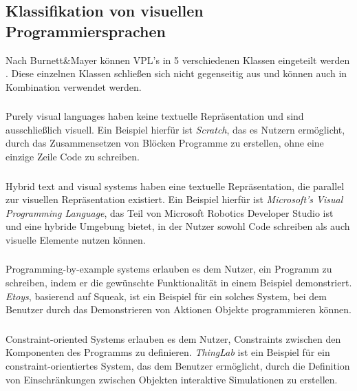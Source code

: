 \documentclass[ngerman]{article}
\begin{document}
\subsection{Klassifikation von visuellen Programmiersprachen}

Nach Burnett\&Mayer können VPL's in 5 verschiedenen Klassen eingeteilt werden \cite{BURNETT1994287}. Diese einzelnen Klassen schließen sich nicht gegenseitig aus und können auch in Kombination verwendet werden.

\subsubsection{}
Purely visual languages haben keine textuelle Repräsentation und sind ausschließlich visuell. Ein Beispiel hierfür ist \textit{Scratch}, das es Nutzern ermöglicht, durch das Zusammensetzen von Blöcken Programme zu erstellen, ohne eine einzige Zeile Code zu schreiben.


\subsubsection{}
Hybrid text and visual systems haben eine textuelle Repräsentation, die parallel zur visuellen Repräsentation existiert. Ein Beispiel hierfür ist \textit{Microsoft's Visual Programming Language}, das Teil von Microsoft Robotics Developer Studio ist und eine hybride Umgebung bietet, in der Nutzer sowohl Code schreiben als auch visuelle Elemente nutzen können.

\subsubsection{}
Programming-by-example systems erlauben es dem Nutzer, ein Programm zu schreiben, indem er die gewünschte Funktionalität in einem Beispiel demonstriert. \textit{Etoys}, basierend auf Squeak, ist ein Beispiel für ein solches System, bei dem Benutzer durch das Demonstrieren von Aktionen Objekte programmieren können.

\subsubsection{}
Constraint-oriented Systems erlauben es dem Nutzer, Constraints zwischen den Komponenten des Programms zu definieren. \textit{ThingLab} ist ein Beispiel für ein constraint-orientiertes System, das dem Benutzer ermöglicht, durch die Definition von Einschränkungen zwischen Objekten interaktive Simulationen zu erstellen.
\end{document}
